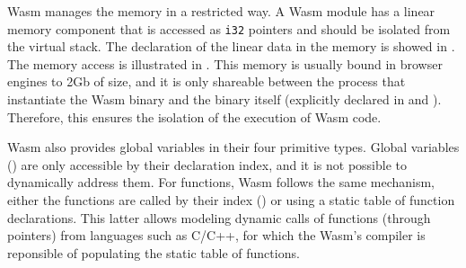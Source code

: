 \begin{code}
    \begin{minipage}[t]{0.4\linewidth}

\end{minipage}\hspace{10mm}
\begin{minipage}[t]{0.4\linewidth}

%

\end{minipage}






\end{code}

Wasm  manages the memory in a restricted way. A Wasm  module has a linear memory component that is accessed as \texttt{i32} pointers and should be isolated from the virtual stack. The declaration of the linear data in the memory is showed in . The memory access is illustrated in . This memory is usually bound in browser engines to 2Gb of size, and it is only shareable between the process that instantiate the Wasm  binary and the binary itself (explicitly declared in  and ). Therefore, this ensures the isolation of the execution of Wasm  code. 

Wasm  also provides global variables in their four primitive types. Global variables () are only accessible by their declaration index, and it is not possible to dynamically address them. For functions, Wasm  follows the same mechanism, either the functions are called by their index () or using a static table of function declarations. This latter allows modeling dynamic calls of functions (through pointers) from languages such as C/C++, for which the Wasm's compiler is reponsible of populating the static table of functions.


